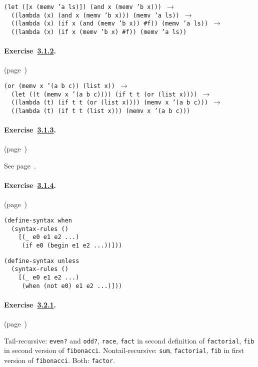   
\begin{alltt}
 (let ([x (memv 'a ls)]) (and x (memv 'b x))) \(\rightarrow\)
   ((lambda (x) (and x (memv 'b x))) (memv 'a ls)) \(\rightarrow\)
   ((lambda (x) (if x (and (memv 'b x)) \#{}f)) (memv 'a ls)) \(\rightarrow\)
   ((lambda (x) (if x (memv 'b x) \#{}f)) (memv 'a ls))
\end{alltt}



\paragraph{Exercise \hyperref[further_g52]{3.1.2}. }(page \pageref{further_s26})

  
\begin{alltt}
 (or (memv x '(a b c)) (list x)) \(\rightarrow\)
   (let ((t (memv x '(a b c)))) (if t t (or (list x)))) \(\rightarrow\)
   ((lambda (t) (if t t (or (list x)))) (memv x '(a b c))) \(\rightarrow\)
   ((lambda (t) (if t t (list x))) (memv x '(a b c)))
\end{alltt}



\paragraph{Exercise \hyperref[further_g53]{3.1.3}. }(page \pageref{further_s27})

  See page \pageref{binding_defn_let*}. 


\paragraph{Exercise \hyperref[further_g54]{3.1.4}. }(page \pageref{further_s29})

  
\begin{alltt}
 (define-syntax when
   (syntax-rules ()
     [(\_{} e0 e1 e2 ...)
      (if e0 (begin e1 e2 ...))])) 

(define-syntax unless
   (syntax-rules ()
     [(\_{} e0 e1 e2 ...)
      (when (not e0) e1 e2 ...)]))
\end{alltt}



\paragraph{Exercise \hyperref[further_g56]{3.2.1}. }(page \pageref{further_s52})

  Tail-recursive: \texttt{even?} and \texttt{odd?}, \texttt{race}, \texttt{fact} in second definition of \texttt{factorial}, \texttt{fib} in second version of \texttt{fibonacci}. Nontail-recursive: \texttt{sum}, \texttt{factorial}, \texttt{fib} in first version of \texttt{fibonacci}. Both: \texttt{factor}. 


